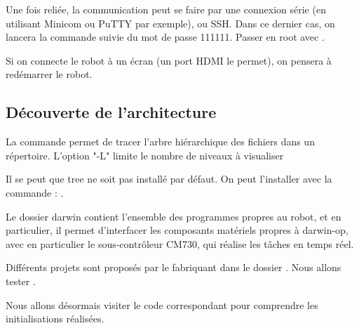 \documentclass[abstracton]{scrartcl}
\begin{document}
Une fois reliée, la communication peut se faire par une connexion série (en utilisant Minicom ou PuTTY par exemple), ou SSH. Dans ce dernier cas, on lancera la commande
     suivie du mot de passe 111111.
    Passer en root avec .

Si on connecte le robot à un écran (un port HDMI le permet), on pensera à redémarrer le robot.


\subsection{Découverte de l'architecture}

La commande  permet de tracer l'arbre hiérarchique des fichiers dans un répertoire. L'option "-L" limite le nombre de niveaux à visualiser

Il se peut que tree ne soit pas installé par défaut. On peut l'installer avec la commande : .


Le dossier darwin contient l'ensemble des programmes propres au robot, et en particulier, il permet d'interfacer les composants matériels propres à darwin-op, avec en particulier le sous-contrôleur CM730, qui réalise les tâches en temps réel.

Différents projets sont proposés par le fabriquant dans le dossier . Nous allons tester .



Nous allons désormais visiter le code correspondant pour comprendre les initialisations réalisées.

\end{document}
